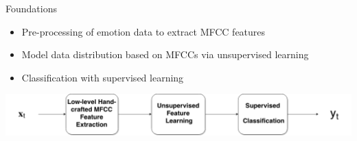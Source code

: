 	\begin{frame}[t]{Foundations}
	      \begin{itemize}
	       \item Pre-processing of emotion data to extract MFCC features
	       \item Model data distribution based on MFCCs via unsupervised learning
	       \item Classification with supervised learning
	      \end{itemize}
	      \vspace{10mm}
	      \includegraphics[width=\linewidth]{Framework.png}

	\end{frame}
% 
% 
% 
% 

